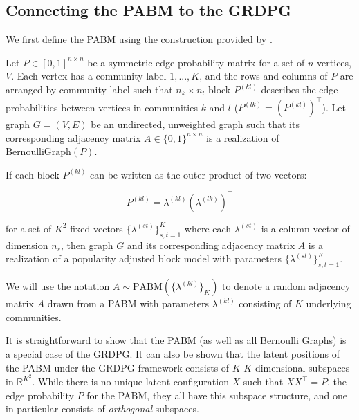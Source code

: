 \documentclass[
  11pt,
]{article}
\begin{document}
\hypertarget{connecting-the-pabm-to-the-grdpg}{%
\subsection{Connecting the PABM to the
GRDPG}\label{connecting-the-pabm-to-the-grdpg}}

We first define the PABM using the construction provided by
\citet{noroozi2019estimation}.

\begin{definition}
\label{pabm}
Let $P \in [0, 1]^{n \times n}$ be a symmetric edge probability matrix for a 
set of $n$ 
vertices, $V$. Each vertex has a community label $1, ..., K$, and the rows and 
columns of $P$ are arranged by community label such that $n_k \times n_l$ block 
$P^{(kl)}$ describes the edge probabilities between vertices in communities 
$k$ and $l$ ($P^{(lk)} = (P^{(kl)})^\top$). 
Let graph $G = (V, E)$ be an undirected, unweighted graph such 
that its corresponding adjacency matrix $A \in \{0, 1\}^{n \times n}$ is a 
realization of $\text{BernoulliGraph}(P)$.

If each block $P^{(kl)}$ can be written as the outer product of two vectors:

\begin{equation} \label{eq:pabm}
  P^{(kl)} = \lambda^{(kl)} (\lambda^{(lk)})^\top
\end{equation}

for a set of $K^2$ fixed vectors $\{\lambda^{(st)}\}_{s, t = 1}^K$ where each 
$\lambda^{(st)}$ is a column vector 
of dimension $n_s$, then graph $G$ and its corresponding adjacency matrix $A$ 
is a realization of a popularity adjusted block model with parameters 
$\{\lambda^{(st)}\}_{s, t = 1}^K$. 
\end{definition}

We will use the notation \(A \sim \text{PABM}(\{\lambda^{(kl)}\}_K)\) to
denote a random adjacency matrix \(A\) drawn from a PABM with parameters
\(\lambda^{(kl)}\) consisting of \(K\) underlying communities.

It is straightforward to show that the PABM (as well as all Bernoulli
Graphs) is a special case of the GRDPG. It can also be shown that the
latent positions of the PABM under the GRDPG framework consists of \(K\)
\(K\)-dimensional subspaces in \(\mathbb{R}^{K^2}\). While there is no
unique latent configuration \(X\) such that \(X X^\top = P\), the edge
probability \(P\) for the PABM, they all have this subspace structure,
and one in particular consists of \emph{orthogonal} subspaces.
\end{document}
